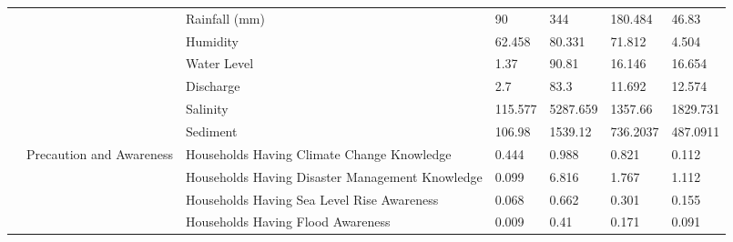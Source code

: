 \begin{table*}[!ht]
{\begin{threeparttable}
\begin{tabular}{|l|l|l|l|l|l|l|}
                            &                                           & Rainfall (mm)\tnote{*}                                   & 90               & 344              & 180.484       & 46.83                       \\ \cline{3-7} 
                            &                                           & Humidity\tnote{*}                                        & 62.458           & 80.331           & 71.812        & 4.504                       \\ \cline{3-7} 
                            &                                             & Water Level\tnote{*}                                       & 1.37          & 90.81     & 16.146     & 16.654                        \\ \cline{3-7} 
                             &                                           & Discharge                                     & 2.7        & 83.3     & 11.692     & 12.574                                            \\ \cline{3-7} 
                            &                                           & Salinity                                      & 115.577        & 5287.659    & 1357.66     & 1829.731                                           \\ \cline{3-7} 
                            &                                           & Sediment\tnote{*}                                                  & 106.98       & 1539.12   & 736.2037     & 487.0911                                                                                                                                                                   \\ \cline{2-7} 
                            & \multirow{5}{*}{Precaution and Awareness} & Households Having Climate Change Knowledge      & 0.444            & 0.988            & 0.821         & 0.112                       \\ \cline{3-7} 
                            &                                           & Households Having Disaster Management Knowledge\tnote{*} & 0.099            & 6.816            & 1.767         & 1.112                       \\ \cline{3-7} 
                            &                                           & Households Having Sea Level Rise Awareness\tnote{*}      & 0.068            & 0.662            & 0.301         & 0.155                       \\ \cline{3-7} 
                            &                                           & Households Having Flood Awareness\tnote{*}               & 0.009            & 0.41             & 0.171         & 0.091                       \\ \cline{3-7} 

\end{tabular}
\end{threeparttable}}
\end{table*}
